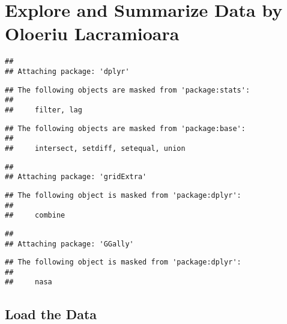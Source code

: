 \documentclass[]{article}
\title{}
\author{}
\date{}
\newenvironment{Shaded}{\begin{snugshade}}{\end{snugshade}}
\newcommand{\KeywordTok}[1]{\textcolor[rgb]{0.13,0.29,0.53}{\textbf{#1}}}
\newcommand{\DataTypeTok}[1]{\textcolor[rgb]{0.13,0.29,0.53}{#1}}
\newcommand{\StringTok}[1]{\textcolor[rgb]{0.31,0.60,0.02}{#1}}
\newcommand{\CommentTok}[1]{\textcolor[rgb]{0.56,0.35,0.01}{\textit{#1}}}
\newcommand{\OtherTok}[1]{\textcolor[rgb]{0.56,0.35,0.01}{#1}}
\newcommand{\OperatorTok}[1]{\textcolor[rgb]{0.81,0.36,0.00}{\textbf{#1}}}
\newcommand{\NormalTok}[1]{#1}
\begin{document}
\begin{Shaded}
\end{Shaded}

\section{Explore and Summarize Data by Oloeriu
Lacramioara}\label{explore-and-summarize-data-by-oloeriu-lacramioara}

\begin{verbatim}
## 
## Attaching package: 'dplyr'
\end{verbatim}

\begin{verbatim}
## The following objects are masked from 'package:stats':
## 
##     filter, lag
\end{verbatim}

\begin{verbatim}
## The following objects are masked from 'package:base':
## 
##     intersect, setdiff, setequal, union
\end{verbatim}

\begin{verbatim}
## 
## Attaching package: 'gridExtra'
\end{verbatim}

\begin{verbatim}
## The following object is masked from 'package:dplyr':
## 
##     combine
\end{verbatim}

\begin{verbatim}
## 
## Attaching package: 'GGally'
\end{verbatim}

\begin{verbatim}
## The following object is masked from 'package:dplyr':
## 
##     nasa
\end{verbatim}

\subsection{Load the Data}\label{load-the-data}
\end{document}
